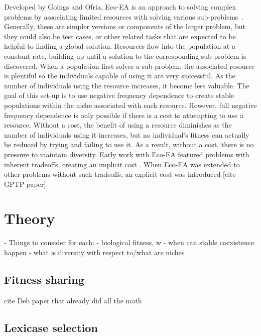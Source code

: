 Developed by Goings and Ofria, Eco-EA is an approach to solving complex problems by associating limited resources with solving various sub-problems~\cite{goings_ecological_2009,goings_natural_2010,goings_ecology-based_2012}. Generally, these are simpler versions or components of the larger problem, but they could also be test cases, or other related tasks that are expected to be helpful to finding a global solution. Resources flow into the population at a constant rate, building up until a solution to the corresponding sub-problem is discovered. When a population first solves a sub-problem, the associated resource is plentiful so the individuals capable of using it are very successful. As the number of individuals using the resource increases, it become less valuable. The goal of this set-up is to use negative frequency dependence to create stable populations within the niche associated with each resource. However, full negative frequency dependence is only possible if there is a cost to attempting to use a resource. Without a cost, the benefit of using a resource diminishes as the number of individuals using it increases, but no individual's fitness can actually be reduced by trying and failing to use it. As a result, without a cost, there is no pressure to maintain diversity. Early work with Eco-EA featured problems with inherent tradeoffs, creating an implicit cost \cite{goings_ecological_2009,goings_ecology-based_2012}. When Eco-EA was extended to other problems without such tradeoffs, an explicit cost was introduced [cite GPTP paper].


\section{Theory}

- Things to consider for each:
- biological fitness, w
- when can stable coexistence happen
- what is diversity with respect to/what are niches

\subsection{Fitness sharing}

cite Deb paper that already did all the math

\subsection{Lexicase selection}

